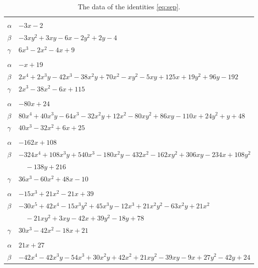 \documentclass[11pt]{article}
\begin{document}
\begingroup\footnotesize
\setlength{\LTcapwidth}{\textwidth}
\begin{longtable}{@{}ll@{}}
\caption{The data of the identities \eqref{eq:sep}.}\label{tab:sep}\\
\hline\endfirsthead\hline\endhead\hline\endfoot
\multicolumn{2}{@{}l}{$\{i,j\}=\{0,1\}$, $k_{ij}=7$}\\
$\alpha$ & $-3x-2$\\
$\beta$ & $-3xy^{2}+3xy-6x-2y^{2}+2y-4$\\
$\gamma$ & $6x^{3}-2x^{2}-4x+9$\\
\addlinespace[3pt]
\multicolumn{2}{@{}l}{$\{i,j\}=\{0,3\}$, $k_{ij}=2^{2}\cdot 7\cdot 13$}\\
$\alpha$ & $-x+19$\\
$\beta$ & $2x^{4}+2x^{3}y-42x^{3}-38x^{2}y+70x^{2}-xy^{2}-5xy+125x+19y^{2}+96y-192$\\
$\gamma$ & $2x^{3}-38x^{2}-6x+115$\\
\addlinespace[3pt]
\multicolumn{2}{@{}l}{$\{i,j\}=\{0,4\}$, $k_{ij}=7^{2}$}\\
$\alpha$ & $-80x+24$\\
$\beta$ & $80x^{4}+40x^{3}y-64x^{3}-32x^{2}y+12x^{2}-80xy^{2}+86xy-110x+24y^{2}+y+48$\\
$\gamma$ & $40x^{3}-32x^{2}+6x+25$\\
\addlinespace[3pt]
\multicolumn{2}{@{}l}{$\{i,j\}=\{0,6\}$, $k_{ij}=2\cdot 3\cdot 13$}\\
$\alpha$ & $-162x+108$\\
$\beta$ & $-324x^{4}+108x^{3}y+540x^{3}-180x^{2}y-432x^{2}-162xy^{2}+306xy-234x+108y^{2}$\\
 & $\quad -138y+216$\\
$\gamma$ & $36x^{3}-60x^{2}+48x-10$\\
\addlinespace[3pt]
\multicolumn{2}{@{}l}{$\{i,j\}=\{0,23\}$, $k_{ij}=2^{2}\cdot 3\cdot 5$}\\
$\alpha$ & $-15x^{3}+21x^{2}-21x+39$\\
$\beta$ & $-30x^{5}+42x^{4}-15x^{3}y^{2}+45x^{3}y-12x^{3}+21x^{2}y^{2}-63x^{2}y+21x^{2}$\\
 & $\quad -21xy^{2}+3xy-42x+39y^{2}-18y+78$\\
$\gamma$ & $30x^{3}-42x^{2}-18x+21$\\
\addlinespace[3pt]
\multicolumn{2}{@{}l}{$\{i,j\}=\{0,87\}$, $k_{ij}=2^{2}\cdot 3$}\\
$\alpha$ & $21x+27$\\
$\beta$ & $-42x^{4}-42x^{3}y-54x^{3}+30x^{2}y+42x^{2}+21xy^{2}-39xy-9x+27y^{2}-42y+24$\\

\end{longtable}
\end{document}
